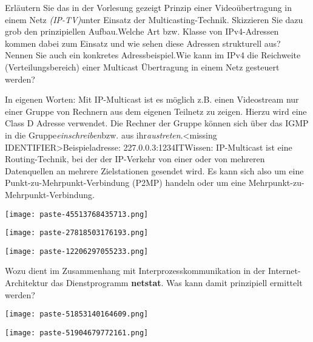 \documentclass{article}
\begin{document}
\begin{tcolorbox}[colback=white!10!white,colframe=lightgray!75!black,
  savelowerto=\jobname_ex.tex,breakable,enhanced,lines before break=40]

\justifying
Erläutern Sie das in der Vorlesung gezeigt Prinzip einer Videoübertragung in einem Netz \textit{(IP-TV)}unter Einsatz der Multicasting-Technik. Skizzieren Sie dazu grob den prinzipiellen Aufbau.Welche Art bzw. Klasse von IPv4-Adressen kommen dabei zum Einsatz und wie sehen diese Adressen strukturell aus? Nennen Sie auch ein konkretes Adressbeispiel.Wie kann im IPv4 die Reichweite (Verteilungsbereich) einer Multicast Übertragung in einem Netz gesteuert werden?

\tcblower

\justifying
In eigenen Worten: Mit IP-Multicast ist es möglich z.B. einen Videostream nur einer Gruppe von Rechnern aus dem eigenen Teilnetz zu zeigen. Hierzu wird eine Class D Adresse verwendet. Die Rechner der Gruppe können sich über das IGMP in die Gruppe\textit{einschreiben}bzw. aus ihr\textit{austreten}.<missing IDENTIFIER>Beispieladresse: 227.0.0.3:1234ITWissen: IP-Multicast ist eine Routing-Technik, bei der der IP-Verkehr von einer oder von mehreren Datenquellen an mehrere Zielstationen gesendet wird. Es kann sich also um eine Punkt-zu-Mehrpunkt-Verbindung (P2MP) handeln oder um eine Mehrpunkt-zu-Mehrpunkt-Verbindung.\begin{center}
\texttt{[image: paste-45513768435713.png]}
\end{center}
\begin{center}
\texttt{[image: paste-27818503176193.png]}
\end{center}
\begin{center}
\texttt{[image: paste-12206297055233.png]}
\end{center}

\end{tcolorbox}
\begin{tcolorbox}[colback=white!10!white,colframe=lightgray!75!black,
  savelowerto=\jobname_ex.tex,breakable,enhanced,lines before break=40]

\justifying
Wozu dient im Zusammenhang mit Interprozesskommunikation in der Internet-Architektur das Dienstprogramm \textbf{netstat}. Was kann damit prinzipiell ermittelt werden?

\tcblower

\justifying
\begin{center}
\texttt{[image: paste-51853140164609.png]}
\end{center}
\begin{center}
\texttt{[image: paste-51904679772161.png]}
\end{center}

\end{tcolorbox}
\end{document}
